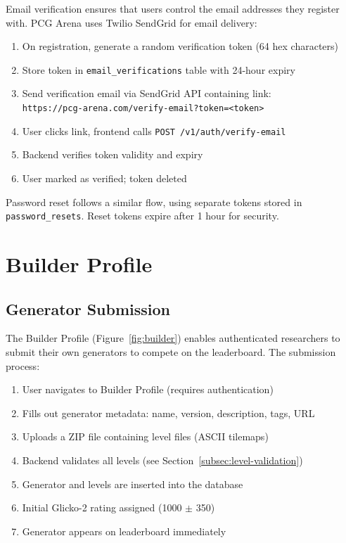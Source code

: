 \documentclass[11pt,a4paper]{article}
\theoremstyle{plain}
\theoremstyle{definition}
\theoremstyle{remark}
\begin{document}
Email verification ensures that users control the email addresses they register with. PCG Arena uses Twilio SendGrid for email delivery:

\begin{enumerate}
    \item On registration, generate a random verification token (64 hex characters)
    \item Store token in \texttt{email\_verifications} table with 24-hour expiry
    \item Send verification email via SendGrid API containing link: \\ \texttt{https://pcg-arena.com/verify-email?token=<token>}
    \item User clicks link, frontend calls \texttt{POST /v1/auth/verify-email}
    \item Backend verifies token validity and expiry
    \item User marked as verified; token deleted
\end{enumerate}

Password reset follows a similar flow, using separate tokens stored in \texttt{password\_resets}. Reset tokens expire after 1 hour for security.

\section{Builder Profile}
\label{sec:builder}

\subsection{Generator Submission}
\label{subsec:generator-submission}

The Builder Profile (Figure~\ref{fig:builder}) enables authenticated researchers to submit their own generators to compete on the leaderboard. The submission process:

\begin{enumerate}
    \item User navigates to Builder Profile (requires authentication)
    \item Fills out generator metadata: name, version, description, tags, URL
    \item Uploads a ZIP file containing level files (ASCII tilemaps)
    \item Backend validates all levels (see Section~\ref{subsec:level-validation})
    \item Generator and levels are inserted into the database
    \item Initial Glicko-2 rating assigned (1000 $\pm$ 350)
    \item Generator appears on leaderboard immediately
\end{enumerate}
\end{document}
